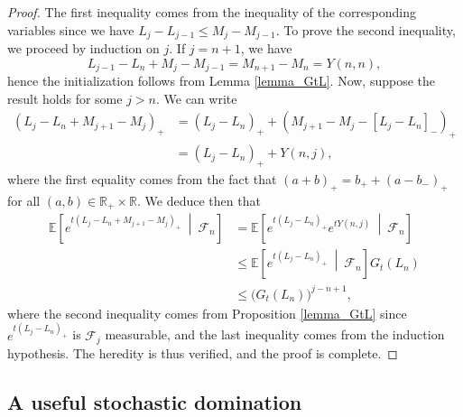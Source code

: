 \documentclass[a4paper, 11pt]{article}
\theoremstyle{plain}
\theoremstyle{definition}
\newcommand{\E}{\mathbb{E}}
\newcommand{\R}{\mathbb{R}}
\numberwithin{equation}{section}
\begin{document}
\begin{proof}
    The first inequality comes from the inequality of the corresponding variables since we have $L_j-L_{j-1}\leq M_j-M_{j-1}$. To prove the second inequality, we proceed by induction on $j$. If $j=n+1$, we have
        \[L_{j-1}-L_n+M_j-M_{j-1}=M_{n+1}-M_n=Y(n, n),\]
    hence the initialization follows from Lemma \ref{lemma_GtL}. Now, suppose the result holds for some $j>n$. We can write
    \begin{equation*}
        \begin{split}
            (L_j-L_n+M_{j+1}-M_j)_+&=(L_j-L_n)_++(M_{j+1}-M_j-[L_{j}-L_n]_-)_+\\
            &=(L_j-L_n)_++Y(n, j),
        \end{split}
    \end{equation*}
    where the first equality comes from the fact that $(a+b)_+=b_++(a-b_-)_+$ for all $(a, b)\in\R_+\times\R$. We deduce then that
    \begin{equation*}
        \begin{split}
            \E\left[e^{t(L_j-L_n+M_{j+1}-M_j)_+}~\middle\vert~\mathcal F_n\right]
            &=\E\left[e^{t(L_j-L_n)_+} e^{tY(n, j)}~\middle\vert~\mathcal F_n\right]\\
            &\leq\E\left[e^{t(L_j-L_n)_+}~\middle\vert~\mathcal F_n\right]G_t(L_n)\\
            &\leq \big(G_t(L_n)\big)^{j-n+1},
        \end{split}
    \end{equation*}
    where the second inequality comes from Proposition \ref{lemma_GtL} since $e^{t(L_j-L_n)_+}$ is $\mathcal F_j$ measurable, and the last inequality comes from the induction hypothesis. The heredity is thus verified, and the proof is complete.
\end{proof}


\subsection{A useful stochastic domination}

\label{subsection_stochastic_domination}
\end{document}
